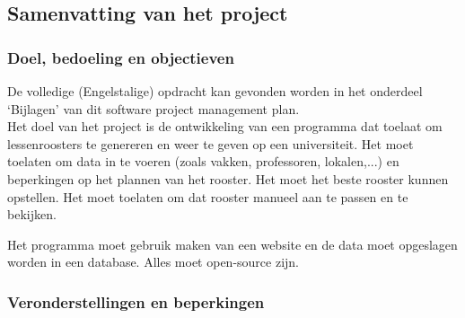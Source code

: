 \documentclass{article}
\begin{document}
\subsection{Samenvatting van het project}

\subsubsection{Doel, bedoeling en objectieven}




De volledige (Engelstalige) opdracht kan gevonden worden in het onderdeel `Bijlagen' van dit software project management plan.\\[3mm]

Het doel van het project is de ontwikkeling van een programma dat toelaat om lessenroosters te genereren en weer te geven op een universiteit. Het moet toelaten om data in te voeren (zoals vakken, professoren, lokalen,...) en beperkingen op het plannen van het rooster. Het moet het beste rooster kunnen opstellen. Het moet toelaten om dat rooster manueel aan te passen en te bekijken.

Het programma moet gebruik maken van een website en de data moet opgeslagen worden in een database. Alles moet open-source zijn.


\subsubsection{Veronderstellingen en beperkingen}
\end{document}
